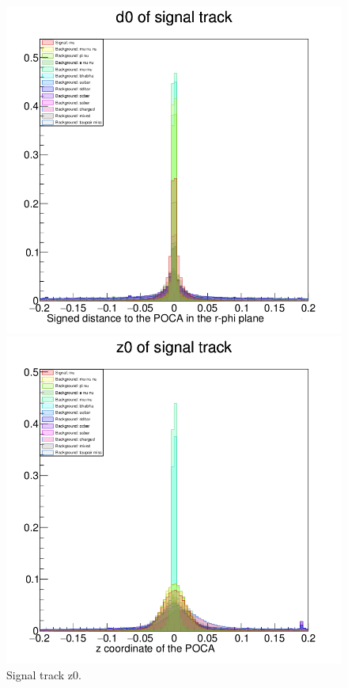 \documentclass[12pt]{thesis}  %
\begin{document}
\begin{figure}
\begin{minipage}{.475\textwidth}
  \includegraphics[width=\linewidth]{images/tauMG-sigD0.png}
  \caption[]%
  {{\small Signal track d0.}}    
  \label{fig:tauMG sigD0}
\end{minipage}%
        \hfill
\begin{minipage}{.475\textwidth}
  \centering
  \includegraphics[width=\linewidth]{images/tauMG-sigZ0.png}
  \caption[]%
  {{\small Signal track z0.}}  
  \label{fig:tauMG sigZ0}
\end{minipage}
\end{figure}
\end{document}
